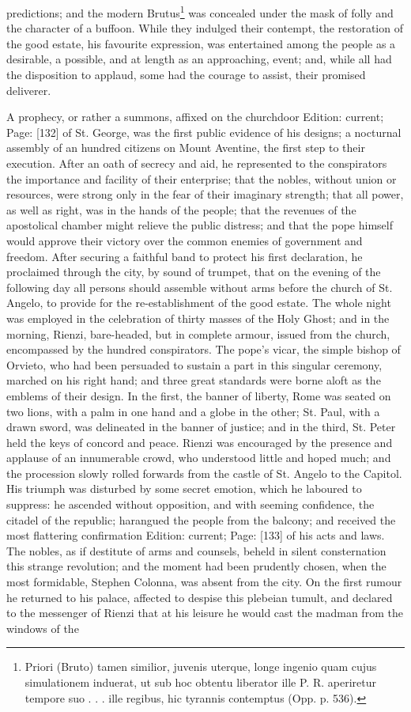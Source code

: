 predictions; and the modern Brutus\footnote{Priori (Bruto) tamen similior, juvenis uterque, longe ingenio quam cujus simulationem induerat, ut sub hoc obtentu liberator ille P. R. aperiretur tempore suo . . . ille regibus, hic tyrannis contemptus (Opp. p. 536).} was concealed under the mask of folly and the character of a buffoon. While they indulged their contempt, the restoration of the good estate, his favourite expression, was entertained among the people as a desirable, a possible, and at length as an approaching, event; and, while all had the disposition to applaud, some had the courage to assist, their promised deliverer.

A prophecy, or rather a summons, affixed on the churchdoor Edition: current; Page: [132] of St. George, was the first public evidence of his designs; a nocturnal assembly of an hundred citizens on Mount Aventine, the first step to their execution. After an oath of secrecy and aid, he represented to the conspirators the importance and facility of their enterprise; that the nobles, without union or resources, were strong only in the fear of their imaginary strength; that all power, as well as right, was in the hands of the people; that the revenues of the apostolical chamber might relieve the public distress; and that the pope himself would approve their victory over the common enemies of government and freedom. After securing a faithful band to protect his first declaration, he proclaimed through the city, by sound of trumpet, that on the evening of the following day all persons should assemble without arms before the church of St. Angelo, to provide for the re-establishment of the good estate. The whole night was employed in the celebration of thirty masses of the Holy Ghost; and in the morning, Rienzi, bare-headed, but in complete armour, issued from the church, encompassed by the hundred conspirators. The pope\texthebrew{}’s vicar, the simple bishop of Orvieto, who had been persuaded to sustain a part in this singular ceremony, marched on his right hand; and three great standards were borne aloft as the emblems of their design. In the first, the banner of liberty, Rome was seated on two lions, with a palm in one hand and a globe in the other; St. Paul, with a drawn sword, was delineated in the banner of justice; and in the third, St. Peter held the keys of concord and peace. Rienzi was encouraged by the presence and applause of an innumerable crowd, who understood little and hoped much; and the procession slowly rolled forwards from the castle of St. Angelo to the Capitol. His triumph was disturbed by some secret emotion, which he laboured to suppress: he ascended without opposition, and with seeming confidence, the citadel of the republic; harangued the people from the balcony; and received the most flattering confirmation Edition: current; Page: [133] of his acts and laws. The nobles, as if destitute of arms and counsels, beheld in silent consternation this strange revolution; and the moment had been prudently chosen, when the most formidable, Stephen Colonna, was absent from the city. On the first rumour he returned to his palace, affected to despise this plebeian tumult, and declared to the messenger of Rienzi that at his leisure he would cast the madman from the windows of the 